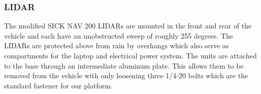\subsubsection{LIDAR}
The modified SICK NAV 200 LIDARs are mounted in the front and rear of the vehicle and each have an unobstructed sweep of roughly 255 degrees. The LIDARs are protected above from rain by overhangs which also serve as compartments for the laptop and electrical power system. The units are attached to the base through an intermediate aluminum plate. This allows them to be removed from the vehicle with only loosening three 1/4-20 bolts which are the standard fastener for our platform.
